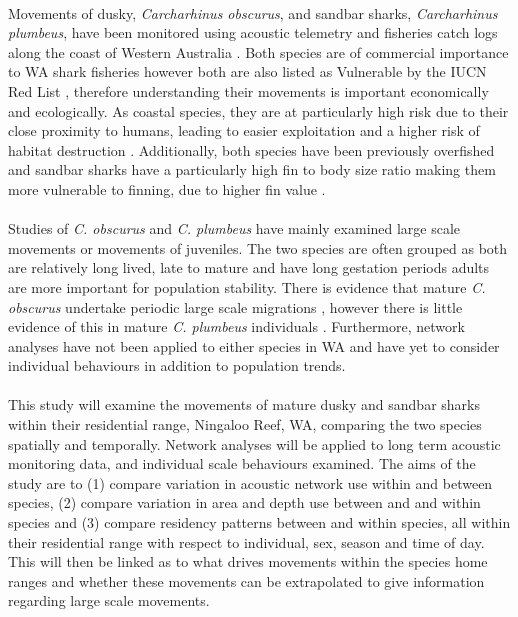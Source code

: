 \documentclass[11pt,a4paper]{article}
\begin{document}
	\\
	Movements of dusky, \textit{Carcharhinus obscurus}, and sandbar sharks, \textit{Carcharhinus plumbeus}, have been monitored using acoustic telemetry \citep{Braccini2016} and fisheries catch logs along the coast of Western Australia \citep{Braccini2017a}. Both species are of commercial importance to WA shark fisheries \citep{Braccini2017a} however both are also listed as Vulnerable by the IUCN Red List \citep{Musick2009,Musick2009a}, therefore understanding their movements is important economically and ecologically. As coastal species, they are at particularly high risk due to their close proximity to humans, leading to easier exploitation \citep{Espinoza2015} and a higher risk of habitat destruction \citep{Speed2010}. Additionally, both species have been previously overfished \citep{Benavides2011,Braccini2017a} and sandbar sharks have a particularly high fin to body size ratio making them more vulnerable to finning, due to higher fin value \citep{Braccini2017c}.\\
	\\
	Studies of \textit{C. obscurus} and \textit{C. plumbeus} have mainly examined large scale movements or movements of juveniles. The two species are often grouped as both are relatively long lived, late to mature and have long gestation periods \citep{Cortes2000,Benavides2011,Braccini2017c,Junge2019} adults are more important for population stability. There is evidence that mature \textit{C. obscurus} undertake periodic large scale migrations \citep{Hussey2009,Braccini2017b}, however there is little evidence of this in mature \textit{C. plumbeus} individuals \citep{Mcauley2005}. Furthermore, network analyses have not been applied to either species in WA and have yet to consider individual behaviours in addition to population trends.\\
	\\	
	This study will examine the movements of mature dusky and sandbar sharks within their residential range, Ningaloo Reef, WA, comparing the two species spatially and temporally. Network analyses will be applied to long term acoustic monitoring data, and individual scale behaviours examined. The aims of the study are to (1) compare variation in acoustic network use within and between species, (2) compare variation in area and depth use between and and within species and (3) compare residency patterns between and within species, all within their residential range with respect to individual, sex, season and time of day. This will then be linked as to what drives movements within the species home ranges and whether these movements can be extrapolated to give information regarding large scale movements.
	
\end{document}
